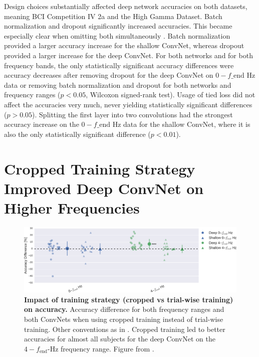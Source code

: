     Design choices substantially affected deep network accuracies on both
datasets, meaning BCI Competition IV 2a and the High Gamma Dataset.
Batch normalization and dropout significantly increased accuracies. This
became especially clear when omitting both simultaneously
. Batch normalization provided a
larger accuracy increase for the shallow ConvNet, whereas dropout
provided a larger increase for the deep ConvNet. For both networks and
for both frequency bands, the only statistically significant accuracy
differences were accuracy decreases after removing dropout for the deep
ConvNet on $0-f\_\textrm{end}$ Hz data or removing batch
normalization and dropout for both networks and frequency ranges
($p<0.05$, Wilcoxon signed-rank test). Usage of tied loss did not
affect the accuracies very much, never yielding statistically
significant differences ($p>0.05$). Splitting the first layer into two
convolutions had the strongest accuracy increase on the
$0-f\_\textrm{end}$ Hz data for the shallow ConvNet, where it is also
the only statistically significant difference ($p<0.01$).

\section{Cropped Training Strategy Improved Deep ConvNet on Higher
Frequencies}\label{cropped-training-strategy-improved-deep-convnet-on-higher-frequencies}

\begin{figure}[htb]
    \myfloatalign
    \includegraphics[width=1\linewidth]{images/Final_Comparison.ipynb.8.pdf-1.png}
    
    \caption[Impact of training strategy on decoding accuracy]{
\textbf{Impact of training strategy (cropped vs trial-wise training) on
accuracy.} Accuracy difference for both frequency ranges and both
ConvNets when using cropped training instead of trial-wise training.
Other conventions as in . Cropped
training led to better accuracies for almost all subjects for the deep
ConvNet on the $4-f_\textrm{end}$-Hz frequency range. Figure from
\citet{schirrmeisterdeephbm2017}. 
}
\label{cropped-training-results-fig}
\end{figure}

